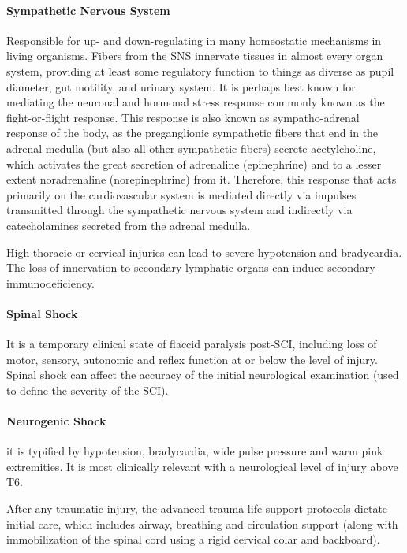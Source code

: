 \documentclass[12pt,article,oneside,a4paper]{memoir}
\begin{document}
\paragraph{Sympathetic Nervous System} Responsible for up- and down-regulating in many homeostatic mechanisms in living organisms. Fibers from the SNS innervate tissues in almost every organ system, providing at least some regulatory function to things as diverse as pupil diameter, gut motility, and urinary system. It is perhaps best known for mediating the neuronal and hormonal stress response commonly known as the fight-or-flight response. This response is also known as sympatho-adrenal response of the body, as the preganglionic sympathetic fibers that end in the adrenal medulla (but also all other sympathetic fibers) secrete acetylcholine, which activates the great secretion of adrenaline (epinephrine) and to a lesser extent noradrenaline (norepinephrine) from it. Therefore, this response that acts primarily on the cardiovascular system is mediated directly via impulses transmitted through the sympathetic nervous system and indirectly via catecholamines secreted from the adrenal medulla.

High thoracic or cervical injuries can lead to severe hypotension and bradycardia. The loss of innervation to secondary lymphatic organs can induce secondary immunodeficiency.

\paragraph{Spinal Shock} It is a temporary clinical state of flaccid paralysis post-SCI, including loss of motor, sensory, autonomic and reflex function at or below the level of injury. Spinal shock can affect the accuracy of the initial neurological examination (used to define the severity of the SCI).

\paragraph{Neurogenic Shock} it is typified by hypotension, bradycardia, wide pulse pressure and warm pink extremities. It is most clinically relevant with a neurological level of injury above T6.

After any traumatic injury, the advanced trauma life support protocols dictate initial care, which includes airway, breathing and circulation support (along with immobilization of the spinal cord using a rigid cervical colar and backboard).
\end{document}
